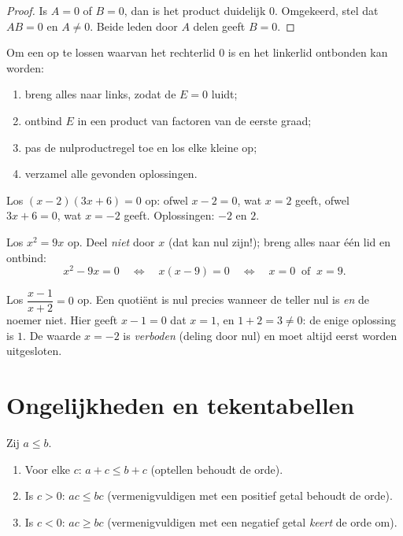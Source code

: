 \begin{proof}
Is $A = 0$ of $B = 0$, dan is het product duidelijk $0$. Omgekeerd, stel dat
$AB = 0$ en $A \neq 0$. Beide leden door $A$ delen geeft $B = 0$.
\end{proof}

\begin{method}\label{met:g10:algebra:zeroproduct}
Om een  op te lossen waarvan het rechterlid $0$ is en het
linkerlid ontbonden kan worden:
\begin{enumerate}
  \item breng alles naar links, zodat de  $E = 0$ luidt;
  \item ontbind $E$ in een product van factoren van de eerste graad;
  \item pas de nulproductregel toe en los elke kleine  op;
  \item verzamel alle gevonden oplossingen.
\end{enumerate}
\end{method}

\begin{example}\label{ex:g10:algebra:zeroproduct}
Los $(x - 2)(3x + 6) = 0$ op: ofwel $x - 2 = 0$, wat $x = 2$ geeft, ofwel
$3x + 6 = 0$, wat $x = -2$ geeft. Oplossingen: $-2$ en $2$.

Los $x^2 = 9x$ op. Deel \emph{niet} door $x$ (dat kan nul zijn!); breng alles
naar één lid en ontbind:
\[
x^2 - 9x = 0
\quad\Longleftrightarrow\quad
x(x - 9) = 0
\quad\Longleftrightarrow\quad
x = 0 \ \text{ of } \ x = 9 .
\]
\end{example}

\begin{example}\label{ex:g10:algebra:quotient}
Los $\dfrac{x - 1}{x + 2} = 0$ op. Een quotiënt is nul precies wanneer de
teller nul is \emph{en} de noemer niet. Hier geeft $x - 1 = 0$ dat $x = 1$,
en $1 + 2 = 3 \neq 0$: de enige oplossing is $1$. De waarde $x = -2$ is
\emph{verboden} (deling door nul) en moet altijd eerst worden uitgesloten.
\end{example}

\section{Ongelijkheden en tekentabellen}

\begin{proposition}\label{prop:g10:algebra:ineqrules}
Zij $a \leq b$.
\begin{enumerate}
  \item Voor elke $c$: $a + c \leq b + c$ (optellen behoudt de orde).
  \item Is $c > 0$: $ac \leq bc$ (vermenigvuldigen met een positief getal
        behoudt de orde).
  \item Is $c < 0$: $ac \geq bc$ (vermenigvuldigen met een negatief getal
        \emph{keert} de orde om).
\end{enumerate}
\end{proposition}

